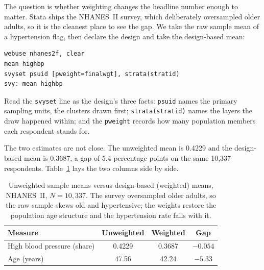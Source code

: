 \documentclass[
    a4paper,
    fontsize=10pt,
    twoside=true,
    numbers=noenddot,
]{kaobook}
\begin{document}
The question is whether weighting changes the headline number enough to matter. Stata ships the NHANES~II survey, which deliberately oversampled older adults, so it is the cleanest place to see the gap. We take the raw sample mean of a hypertension flag, then declare the design and take the design-based mean:
\par
{\footnotesize
\begin{verbatim}
webuse nhanes2f, clear
mean highbp
svyset psuid [pweight=finalwgt], strata(stratid)
svy: mean highbp
\end{verbatim}
}
Read the \texttt{svyset} line as the design's three facts: \texttt{psuid} names the primary sampling units, the clusters drawn first; \texttt{strata(stratid)} names the layers the draw happened within; and the \texttt{pweight} records how many population members each respondent stands for.

The two estimates are not close. The unweighted mean is 0.4229 and the design-based mean is 0.3687, a gap of 5.4 percentage points on the same 10{,}337 respondents. Table~\ref{tab:weights} lays the two columns side by side.

\begin{table}[htbp]
\centering
\caption[Weighted versus unweighted means, NHANES~II]{Unweighted sample means versus design-based (weighted) means, NHANES~II, $N=10{,}337$. The survey oversampled older adults, so the raw sample skews old and hypertensive; the weights restore the population age structure and the hypertension rate falls with it.}
\label{tab:weights}
{\footnotesize
\begin{tabular}{lccc}
\hline
Measure & Unweighted & Weighted & Gap \\
\hline
High blood pressure (share) & 0.4229 & 0.3687 & $-0.054$ \\
Age (years)                 & 47.56  & 42.24  & $-5.33$ \\
\hline
\end{tabular}
}
\end{table}
\end{document}
